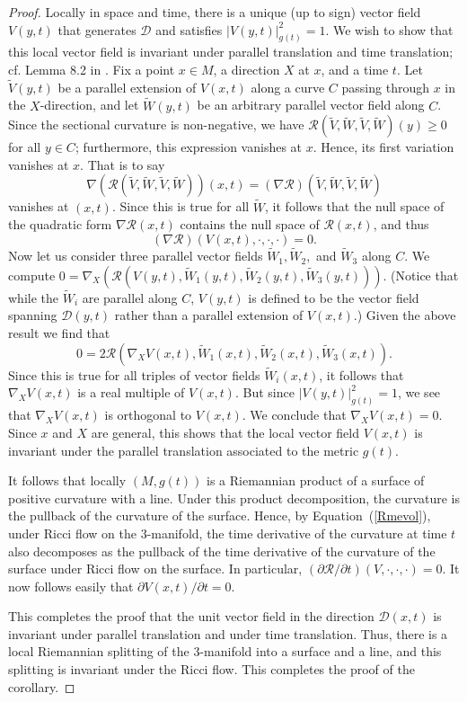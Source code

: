 \begin{proof}
Locally in space and time, there is a unique (up to sign) vector field $V(y,t)$
that generates ${\mathcal D}$ and satisfies $|V(y,t)|^2_{g(t)}=1$. We wish to
show that this local vector field is invariant under parallel translation and
time translation; cf. Lemma 8.2 in \cite{Hamilton4MPCO}. Fix a point $x\in M$,
a direction $X$ at $x$, and a time $t$. Let $\tilde V(y,t)$ be a parallel
extension of $V(x,t)$ along a curve $C$ passing through $x$ in the
$X$-direction, and let $\tilde W(y,t)$ be an arbitrary parallel vector field
along $C$. Since the sectional curvature is non-negative, we have ${\mathcal
R}(\tilde V,\tilde W,\tilde V,\tilde W)(y)\ge 0$ for all $y\in C$; furthermore,
this expression vanishes at $x$. Hence, its first variation vanishes at $x$.
That is to say
$$\nabla \left({\mathcal R}(\tilde V,\tilde W,\tilde V,\tilde W)\right)(x,t)=(\nabla{\mathcal R})(\tilde
V,\tilde W,\tilde V,\tilde W)$$ vanishes at $(x,t)$. Since this is true for all
$\tilde W$, it follows that the null space of the quadratic form
$\nabla{\mathcal R}(x,t)$ contains the null space of ${\mathcal R}(x,t)$, and
thus $$(\nabla {\mathcal R})(V(x,t),\cdot,\cdot,\cdot)=0.$$
 Now let us consider three parallel
vector fields $\tilde W_1,\tilde W_2,$ and $\tilde W_3$ along $C$.
We compute $0=\nabla_X\left({\mathcal R}( V(y,t),\tilde
W_1(y,t),\tilde W_2(y,t),\tilde W_3(y,t))\right)$. (Notice that
while the $\tilde W_i$ are parallel along $C$, $V(y,t)$ is defined
to be the vector field spanning ${\mathcal D}(y,t)$ rather than a
parallel extension of $V(x,t)$.) Given the above result we find that
$$0=2{\mathcal R}(\nabla_X V(x,t),\tilde W_1(x,t),\tilde W_2(x,t),
\tilde W_3(x,t)).$$ Since this is true for all triples of vector
fields $\tilde W_i(x,t)$, it follows that $\nabla_XV(x,t)$ is a real
multiple of $V(x,t)$. But since $|V(y,t)|^2_{g(t)}=1$, we see that
$\nabla_XV(x,t)$ is orthogonal to $V(x,t)$. We conclude that
$\nabla_XV(x,t)=0$. Since $x$ and $X$ are general, this shows that
the local vector field $V(x,t)$ is invariant under the parallel
translation associated to the metric $g(t)$.

It follows that locally $(M,g(t))$ is a Riemannian product of a surface of
positive curvature with a line. Under this product decomposition, the curvature
is the pullback of the curvature of the surface. Hence, by
Equation~(\ref{Rmevol}), under Ricci flow on the $3$-manifold, the time
derivative of the curvature at time $t$ also decomposes as the pullback of the
time derivative of the curvature of the surface under Ricci flow on the
surface. In particular, $(\partial {\mathcal R}/\partial
t)(V,\cdot,\cdot,\cdot)=0$. It now follows easily that $\partial
V(x,t)/\partial t=0$.

This completes the proof that the unit vector field in the direction ${\mathcal
D}(x,t)$ is invariant under parallel translation and under time translation.
Thus, there is a local Riemannian splitting of the $3$-manifold into a surface
and a line, and this splitting is invariant under the Ricci flow. This
completes the proof of the corollary.
\end{proof}

